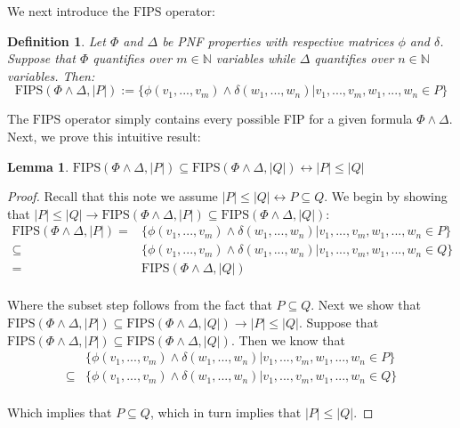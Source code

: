 \documentclass[12pt]{article}
\newtheorem{lemma}{Lemma}
\newtheorem{definition}{Definition}
\newcommand{\fips}{\text{FIPS}}
\begin{document}
We next introduce the $\fips$ operator:
\begin{definition}
  Let $\Phi$ and $\Delta$ be PNF properties with respective matrices $\phi$ and $\delta$.  Suppose that $\Phi$ quantifies over $m \in \mathbb{N}$ variables while $\Delta$ quantifies over $n \in \mathbb{N}$ variables.  Then:
  $$\fips(\Phi \land \Delta, |P|) := \{\phi(v_1,...,v_m) \land \delta(w_1,...,w_n) | v_1,...,v_m,w_1,...,w_n \in P\}$$
\end{definition}

The $\fips$ operator simply contains every possible FIP for a given formula $\Phi \land \Delta$.  Next, we prove this intuitive result:

\begin{lemma}
  $\fips(\Phi \land \Delta, |P|) \subseteq \fips(\Phi \land \Delta, |Q|) \leftrightarrow |P| \leq |Q|$
\end{lemma}
\begin{proof}
  Recall that this note we assume $|P| \leq |Q| \leftrightarrow P \subseteq Q$.  We begin by showing that $|P| \leq |Q| \rightarrow \fips(\Phi \land \Delta, |P|) \subseteq \fips(\Phi \land \Delta, |Q|)$:
  \begin{align*}
    \fips(\Phi \land \Delta, |P|) = &\{\phi(v_1,...,v_m) \land \delta(w_1,...,w_n) | v_1,...,v_m,w_1,...,w_n \in P\}\\
    \subseteq &\{\phi(v_1,...,v_m) \land \delta(w_1,...,w_n) | v_1,...,v_m,w_1,...,w_n \in Q\}\\
    = &\fips(\Phi \land \Delta, |Q|)\\
  \end{align*}

  Where the subset step follows from the fact that $P \subseteq Q$.  Next we show that $\fips(\Phi \land \Delta, |P|) \subseteq \fips(\Phi \land \Delta, |Q|) \rightarrow |P| \leq |Q|$.  Suppose that $\fips(\Phi \land \Delta, |P|) \subseteq \fips(\Phi \land \Delta, |Q|)$.  Then we know that 
  \begin{align*}
    &\{\phi(v_1,...,v_m) \land \delta(w_1,...,w_n) | v_1,...,v_m,w_1,...,w_n \in P\}\\
    \subseteq &\{\phi(v_1,...,v_m) \land \delta(w_1,...,w_n) | v_1,...,v_m,w_1,...,w_n \in Q\}\\
  \end{align*}

  Which implies that $P \subseteq Q$, which in turn implies that $|P| \leq |Q|$.

\end{proof}
\end{document}
